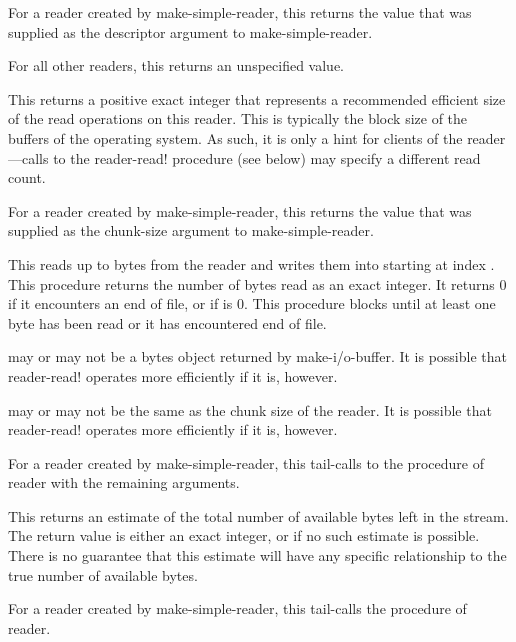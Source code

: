 \begin{entry}{%
}
   
For a reader created by {\cf make-simple-reader}, this returns the value that was
supplied as the descriptor argument to {\cf make-simple-reader}.
   
For all other readers, this returns an unspecified value.
\end{entry}

\begin{entry}{%
}
   
This returns a positive exact integer that represents a recommended
efficient size of the read operations on this reader. This is typically the
block size of the buffers of the operating system. As such, it is only a
hint for clients of the reader---calls to the {\cf reader-read!} procedure (see
below) may specify a different read count.

For a reader created by {\cf make-simple-reader}, this returns the
value that was supplied as the chunk-size argument to {\cf
  make-simple-reader}.
\end{entry}

\begin{entry}{%
}
   
This reads up to  bytes from the reader and writes them into
 starting at index
.  This procedure returns the number of bytes read
as an exact integer. It returns 0 if it encounters an end of file, or
if  is 0.  This procedure blocks until at least one byte has been
read or it has encountered end of file.
   
 may or may not be a bytes object returned by {\cf
  make-i/o-buffer}. It is possible that {\cf reader-read!} operates
more efficiently if it is, however.
   
 may or may not be the same as the chunk size of the
reader. It is possible that {\cf reader-read!} operates more
efficiently if it is, however.
   
For a reader created by {\cf make-simple-reader}, this tail-calls to
the  procedure of reader with the remaining arguments.
\end{entry}

\begin{entry}{%
}
   
This returns an estimate of the total number of available bytes left in the
stream. The return value is either an exact integer, or \schfalse{} if no such
estimate is possible. There is no guarantee that this estimate will have
any specific relationship to the true number of available bytes.
   
For a reader created by {\cf make-simple-reader}, this tail-calls the 
procedure of reader.
\end{entry}   

